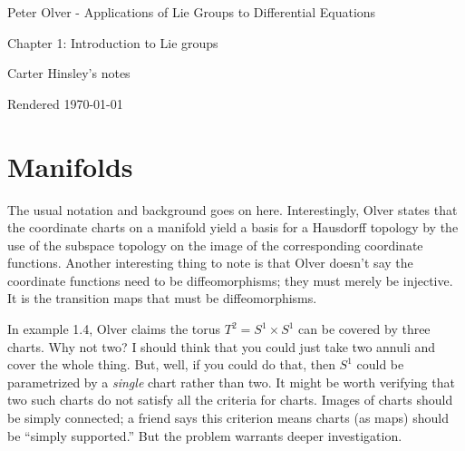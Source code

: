 \documentclass[a4paper]{article}
\begin{document}
\begin{center}
\LARGE{Peter Olver - Applications of Lie Groups to Differential Equations}

\Large{Chapter 1: Introduction to Lie groups}

\large{Carter Hinsley's notes}

Rendered \today
\end{center}

\section{Manifolds}

The usual notation and background goes on here. Interestingly, Olver states that the coordinate charts on a manifold yield a basis for a Hausdorff topology by the use of the subspace topology on the image of the corresponding coordinate functions. Another interesting thing to note is that Olver doesn't say the coordinate functions need to be diffeomorphisms; they must merely be injective. It is the transition maps that must be diffeomorphisms.

In example 1.4, Olver claims the torus $T^2 = S^1 \times S^1$ can be covered by three charts. Why not two? I should think that you could just take two annuli and cover the whole thing. But, well, if you could do that, then $S^1$ could be parametrized by a \emph{single} chart rather than two. It might be worth verifying that two such charts do not satisfy all the criteria for charts. Images of charts should be simply connected; a friend says this criterion means charts (as maps) should be ``simply supported.'' But the problem warrants deeper investigation.
\end{document}
